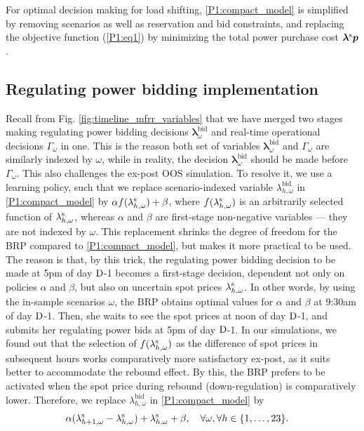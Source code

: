 For optimal decision making for load shifting, \eqref{P1:compact_model} is simplified by removing scenarios as well as reservation and bid constraints, and replacing the objective function (\ref{P1:eq1}) by minimizing the total power purchase cost $\bm{\lambda}^{\rm{s}} \bm{p}$.

\vspace{-1mm}
\subsection{Regulating power bidding implementation}\label{sec:mFRR_bidding_implementation}
Recall from  Fig. \ref{fig:timeline_mfrr_variables} that we have merged two stages making regulating power bidding decisions $\bm{\lambda}_{\omega}^{\text{bid}}$ and real-time operational decisions $\Gamma_{\omega}$ in one. This is the reason both set of variables $\bm{\lambda}_{\omega}^{\text{bid}}$ and $\Gamma_{\omega}$ are similarly indexed by $\omega$, while in reality, the decision $\bm{\lambda}_{\omega}^{\text{bid}}$ should be made before $\Gamma_{\omega}$. This also challenges the ex-post OOS simulation. To resolve it, we use a learning policy, such that we replace scenario-indexed variable $\lambda_{h,\omega}^{\text{bid}}$ in \eqref{P1:compact_model} by $\alpha f(\lambda_{h,\omega}^{\rm{s}}) + \beta$, where $f(\lambda_{h,\omega}^{\rm{s}})$ is an arbitrarily selected function of $\lambda_{h,\omega}^{\rm{s}}$, whereas $\alpha$ and $\beta$ are first-stage non-negative variables --- they are not indexed by $\omega$. This replacement shrinks the degree of freedom for the BRP compared to \eqref{P1:compact_model}, but makes it more practical to be used. The reason is that, by this trick, the regulating power bidding decision to be made at 5pm of day $\rm{D}$-1 becomes a first-stage decision, dependent not only on policies $\alpha$ and $\beta$, but also on uncertain spot prices $\lambda_{h,\omega}^{\rm{s}}$. In other words, by using the in-sample scenarios $\omega$, the BRP obtains optimal values for $\alpha$ and $\beta$ at 9:30am of day $\rm{D}$-1. Then, she waits to see the spot prices at noon of day $\rm{D}$-1, and  submits her regulating power bids at 5pm of day $\rm{D}$-1. In our simulations, we found out that the selection of $f(\lambda_{h,\omega}^{\rm{s}})$ as the difference of spot prices in subsequent hours works comparatively more satisfactory ex-post, as it suits better to accommodate the rebound effect. By this, the BRP prefers to be activated when the spot price during rebound (down-regulation) is comparatively lower. Therefore, we replace $\lambda_{h,\omega}^{\text{bid}}$ in \eqref{P1:compact_model} by
%
\begin{align}\label{eq:affine_policy}
     & \alpha ( \lambda_{h+1,\omega}^{\rm{s}} - \lambda_{h,\omega}^{\rm{s}}) + \lambda_{h,\omega}^{\rm{s}} + \beta, \quad \forall{\omega}, \forall{h} \in \{1, \ldots, 23\}.
\end{align}



